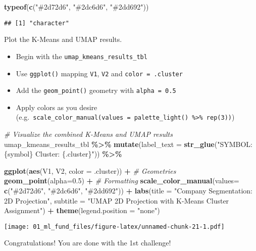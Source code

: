 \documentclass[
]{article}
\newenvironment{Shaded}{\begin{snugshade}}{\end{snugshade}}
\newcommand{\AttributeTok}[1]{\textcolor[rgb]{0.13,0.29,0.53}{#1}}
\newcommand{\CommentTok}[1]{\textcolor[rgb]{0.56,0.35,0.01}{\textit{#1}}}
\newcommand{\FloatTok}[1]{\textcolor[rgb]{0.00,0.00,0.81}{#1}}
\newcommand{\FunctionTok}[1]{\textcolor[rgb]{0.13,0.29,0.53}{\textbf{#1}}}
\newcommand{\NormalTok}[1]{#1}
\newcommand{\SpecialCharTok}[1]{\textcolor[rgb]{0.81,0.36,0.00}{\textbf{#1}}}
\newcommand{\StringTok}[1]{\textcolor[rgb]{0.31,0.60,0.02}{#1}}
\providecommand{\tightlist}{%
  \setlength{\itemsep}{0pt}\setlength{\parskip}{0pt}}
\begin{document}
\begin{Shaded}
\begin{Highlighting}[]
\FunctionTok{typeof}\NormalTok{(}\FunctionTok{c}\NormalTok{(}\StringTok{"\#2d72d6"}\NormalTok{, }\StringTok{"\#2dc6d6"}\NormalTok{, }\StringTok{"\#2dd692"}\NormalTok{))}
\end{Highlighting}
\end{Shaded}

\begin{verbatim}
## [1] "character"
\end{verbatim}

Plot the K-Means and UMAP results.

\begin{itemize}
\tightlist
\item
  Begin with the \texttt{umap\_kmeans\_results\_tbl}
\item
  Use \texttt{ggplot()} mapping \texttt{V1}, \texttt{V2} and
  \texttt{color\ =\ .cluster}
\item
  Add the \texttt{geom\_point()} geometry with \texttt{alpha\ =\ 0.5}
\item
  Apply colors as you desire
  (e.g.~\texttt{scale\_color\_manual(values\ =\ palette\_light()\ \%\textgreater{}\%\ rep(3))})
\end{itemize}

\begin{Shaded}
\begin{Highlighting}[]
\CommentTok{\# Visualize the combined K{-}Means and UMAP results}
\NormalTok{umap\_kmeans\_results\_tbl }\SpecialCharTok{\%\textgreater{}\%}
    \FunctionTok{mutate}\NormalTok{(}\AttributeTok{label\_text =} \FunctionTok{str\_glue}\NormalTok{(}\StringTok{"SYMBOL: \{symbol\}}
\StringTok{                                 Cluster: \{.cluster\}"}\NormalTok{)) }\SpecialCharTok{\%\textgreater{}\%}
    
    \FunctionTok{ggplot}\NormalTok{(}\FunctionTok{aes}\NormalTok{(V1, V2, }\AttributeTok{color =}\NormalTok{ .cluster)) }\SpecialCharTok{+}
    \CommentTok{\# Geometries}
    \FunctionTok{geom\_point}\NormalTok{(}\AttributeTok{alpha=}\FloatTok{0.5}\NormalTok{) }\SpecialCharTok{+}
    \CommentTok{\# Formatting}
    \FunctionTok{scale\_color\_manual}\NormalTok{(}\AttributeTok{values=} \FunctionTok{c}\NormalTok{(}\StringTok{"\#2d72d6"}\NormalTok{, }\StringTok{"\#2dc6d6"}\NormalTok{, }\StringTok{"\#2dd692"}\NormalTok{)) }\SpecialCharTok{+}
    \FunctionTok{labs}\NormalTok{(}\AttributeTok{title =} \StringTok{"Company Segmentation: 2D Projection"}\NormalTok{,}
    \AttributeTok{subtitle =} \StringTok{"UMAP 2D Projection with K{-}Means Cluster Assignment"}\NormalTok{) }\SpecialCharTok{+}
    \FunctionTok{theme}\NormalTok{(}\AttributeTok{legend.position =} \StringTok{"none"}\NormalTok{)}
\end{Highlighting}
\end{Shaded}

\texttt{[image: 01\_ml\_fund\_files/figure-latex/unnamed-chunk-21-1.pdf]}

Congratulations! You are done with the 1st challenge!
\end{document}
